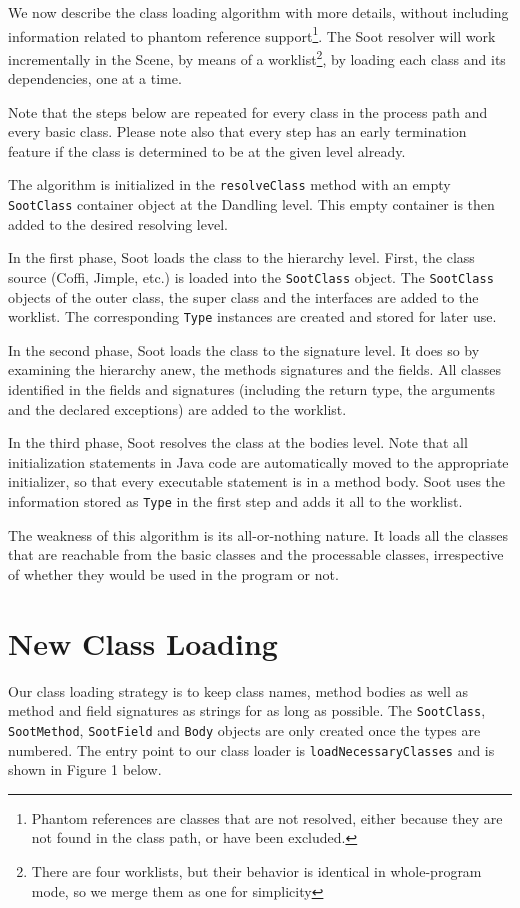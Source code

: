 \documentclass[preprint]{sigplanconf}
\begin{document}
We now describe the class loading algorithm with more details, without including information related to phantom reference support\footnote{Phantom references are classes that are not resolved, either because they are not found in the class path, or have been excluded.}.
The Soot resolver will work incrementally in the Scene, by means of a worklist\footnote{There are four worklists, but their behavior is identical in whole-program mode, so we merge them as one for simplicity}, by loading each class and its dependencies, one at a time.

Note that the steps below are repeated for every class in the process path and every basic class. Please note also that every step has an early termination feature if the class is determined to be at the given level already.

The algorithm is initialized in the {\tt resolveClass} method with an empty {\tt SootClass} container object at the Dandling level. This empty container is then added to the desired resolving level.

In the first phase, Soot loads the class to the hierarchy level. First, the class source (Coffi, Jimple, etc.) is loaded into the {\tt SootClass} object.
The {\tt SootClass} objects of the outer class, the super class and the interfaces are added to the worklist. The corresponding {\tt Type} instances are created and stored for later use.

In the second phase, Soot loads the class to the signature level. It does so by examining the hierarchy anew, the methods signatures and the fields. All classes identified in the fields and signatures (including the return type, the arguments and the declared exceptions) are added to the worklist.

In the third phase, Soot resolves the class at the bodies level. Note that all initialization statements in Java code are automatically moved to the appropriate initializer, so that every executable statement is in a method body. Soot uses the information stored as {\tt Type} in the first step and adds it all to the worklist.

The weakness of this algorithm is its all-or-nothing nature. It loads all the classes that are reachable from the basic classes and the processable classes, irrespective of whether they would be used in the program or not.


\section{New Class Loading}
\label{sec:new-cl}
Our class loading strategy is to keep class names, method bodies as well as method and field signatures as strings for as long as possible. The {\tt SootClass}, {\tt SootMethod}, {\tt SootField} and {\tt Body} objects are only created once the types are numbered. The entry point to our class loader is {\tt loadNecessaryClasses} and is shown in Figure 1 below.
\end{document}
